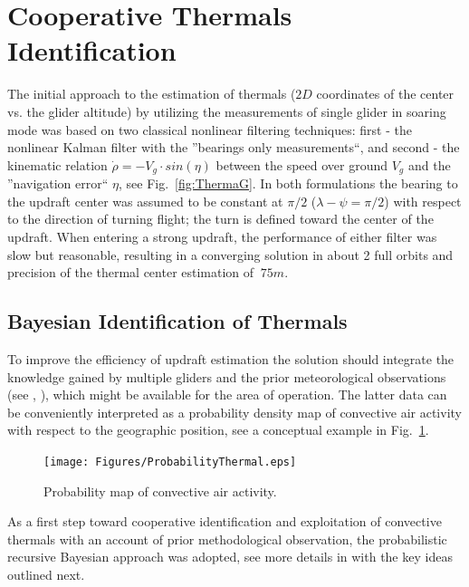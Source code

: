 \documentclass{ifacconf}
\newcommand{\squeezeup}{\vspace{-3.0mm}}
\begin{document}
\section{Cooperative Thermals Identification }
\label{sec:CoopAlgs}
\squeezeup
The initial approach to the estimation of thermals ($2D$ coordinates of the
center vs. the glider altitude) by utilizing the measurements of single
glider in soaring mode was based on two classical nonlinear filtering
techniques: first - the nonlinear Kalman filter with the ''bearings only
measurements``, and second - the kinematic relation $\dot{\rho}=-V_g\cdot
sin(\eta)$ between the speed over ground $V_g$ and the ''navigation error``
$\eta$, see Fig.~\ref{fig:ThermaG}. In both formulations the bearing to the
updraft center was assumed to be constant at $\pi/2$ ($\lambda-\psi=\pi/2$)
with respect to the direction of turning flight; the turn is defined toward
the center of the updraft. When entering a strong updraft, the performance of
either filter was slow but reasonable, resulting in a converging solution in
about 2 full orbits and precision of the thermal center estimation of
$~75m$.
%

\subsection{Bayesian Identification of Thermals}
\label{subsec:BayesianMapping}
\squeezeup

To improve the efficiency of updraft estimation the solution should integrate
the knowledge gained by multiple gliders and the prior meteorological
observations (see \cite{Pennycuick:1998}, \cite{Hindman:2007}), which might
be available for the area of operation. The latter data can be conveniently
interpreted as a probability density map of convective air activity with
respect to the geographic position, see a conceptual example in
Fig.~\ref{fig:HeatMap}.
\begin{figure}[thpb]
  \centering
  \texttt{[image: Figures/ProbabilityThermal.eps]}
  \caption{Probability map of convective air activity.}
  \label{fig:HeatMap}
\end{figure}
As a first step toward cooperative identification and exploitation of
convective thermals with an account of prior methodological observation, the
probabilistic recursive Bayesian approach was adopted, see more details in
\cite{Bergman:1999} with the key ideas outlined next.
\end{document}
